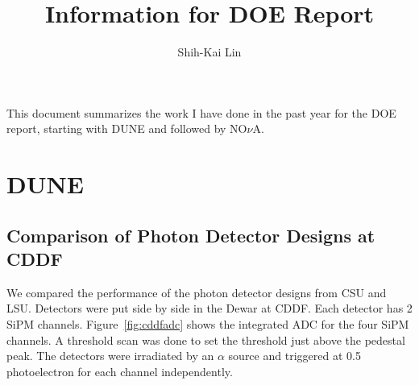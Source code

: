 \documentclass[12pt,a4paper,final]{iopart}
\begin{document}
\title[Information for DOE Report]{Information for DOE Report}
	
\author[cor1]{Shih-Kai Lin}
\address{Colorado State University}


%


\vspace{\baselineskip}
This document summarizes the work I have done in the past year for the DOE report, starting with DUNE and followed by NO$\nu$A.

\section{DUNE}

\subsection{Comparison of Photon Detector Designs at CDDF}
We compared the performance of the photon detector designs from CSU and LSU. Detectors were put side by side in the Dewar at CDDF. Each detector has 2 SiPM channels. Figure~\ref{fig:cddfadc} shows the integrated ADC for the four SiPM channels. A threshold scan was done to set the threshold just above the pedestal peak. The detectors were irradiated by an $\alpha$ source and triggered at 0.5 photoelectron for each channel independently.
\end{document}

